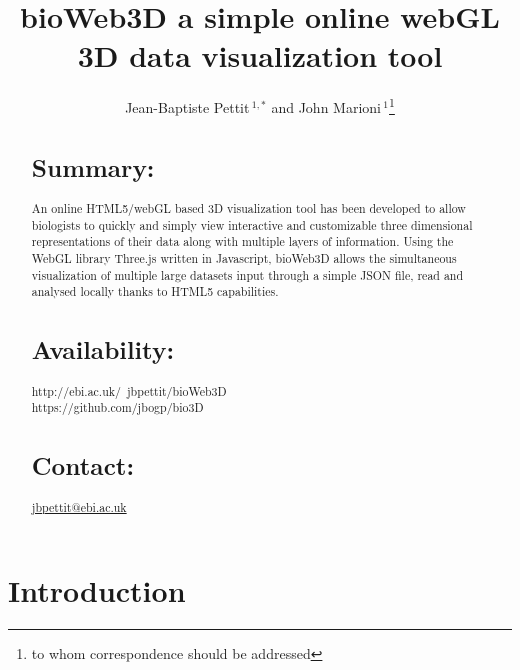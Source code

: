 \documentclass{bioinfo}
\begin{document}

\title[Application Note]{bioWeb3D a simple online webGL 3D data visualization tool}
\author[Sample \textit{et~al}]{Jean-Baptiste Pettit\,$^{1,*}$ and John Marioni\,$^{1}$\footnote{to whom correspondence should be addressed}}
\address{$^{1}$Department of XXXXXXX, Address XXXX etc.\\
$^{1}$European Bioinformatics Institute}



\maketitle

\begin{abstract}

\section{Summary:}
An online HTML5/webGL based 3D visualization tool has been developed to allow biologists to quickly and simply view interactive and customizable three dimensional representations of their data along with multiple layers of information. Using the WebGL library Three.js written in Javascript, bioWeb3D allows the simultaneous visualization of multiple large datasets input through a simple JSON file, read and analysed locally thanks to HTML5 capabilities.

\section{Availability:}
http://ebi.ac.uk/~jbpettit/bioWeb3D \\ https://github.com/jbogp/bio3D

\section{Contact:} \href{jbpettit@ebi.ac.uk}{jbpettit@ebi.ac.uk}
\end{abstract}

\section{Introduction}
\end{document}
